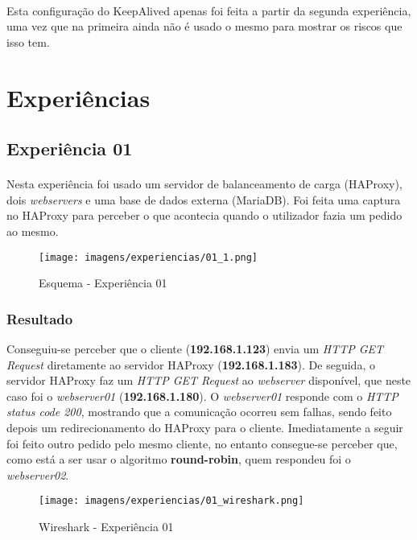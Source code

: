 \documentclass{report}
\begin{document}
\paragraph{}
Esta configuração do KeepAlived apenas foi feita a partir da segunda experiência, uma vez que na primeira ainda não é usado o mesmo para mostrar os riscos que isso tem.

\section{Experiências}

\subsection{Experiência 01}
\paragraph{}
Nesta experiência foi usado um servidor de balanceamento de carga (HAProxy), dois \emph{webservers} e uma base de dados externa (MariaDB). Foi feita uma captura no HAProxy para perceber o que acontecia quando o utilizador fazia um pedido ao mesmo.

\begin{figure}[H]
\center
\texttt{[image: imagens/experiencias/01\_1.png]}
\caption{Esquema - Experiência 01}
\label{fig.nav}
\end{figure}


\subsubsection{Resultado}
Conseguiu-se perceber que o cliente (\textbf{192.168.1.123}) envia um \emph{HTTP GET Request} diretamente ao servidor HAProxy (\textbf{192.168.1.183}).
De seguida, o servidor HAProxy faz um \emph{HTTP GET Request} ao \emph{webserver} disponível, que neste caso foi o \emph{webserver01} (\textbf{192.168.1.180}).
O \emph{webserver01} responde com o \emph{HTTP status code 200}, mostrando que a comunicação ocorreu sem falhas, sendo feito depois um redirecionamento do HAProxy para o cliente.
Imediatamente a seguir foi feito outro pedido pelo mesmo cliente, no entanto consegue-se perceber que, como está a ser usar o algoritmo \textbf{round-robin}, quem respondeu foi o \emph{webserver02}.

\begin{figure}[H]
\center
\texttt{[image: imagens/experiencias/01\_wireshark.png]}
\caption{Wireshark - Experiência 01}
\label{fig.nav}
\end{figure}
\end{document}
